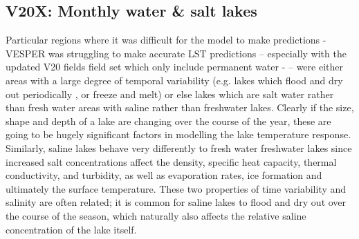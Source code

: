 \documentclass[hess, twostagejnl]{copernicus}
\providecommand{\DIFadd}[1]{{\protect\color{blue} \sf #1}} %
\providecommand{\DIFdel}[1]{{\protect\color{red} \scriptsize #1}} %
\providecommand{\DIFaddbegin}{} %
\providecommand{\DIFaddend}{} %
\providecommand{\DIFdelbegin}{} %
\providecommand{\DIFdelend}{} %
\begin{document}
\DIFaddend 

\DIFdelbegin \subsection{\DIFdel{V20X: Monthly water \& salt lakes}}
\addtocounter{subsection}{-1}%
\DIFdelend Particular regions where \DIFdelbegin \DIFdel{it was difficult for the model to make predictions - }\DIFdelend \DIFaddbegin \DIFadd{VESPER was struggling to make accurate LST predictions – }\DIFaddend especially with the updated V20 \DIFdelbegin \DIFdel{fields }\DIFdelend \DIFaddbegin \DIFadd{field set }\DIFaddend which only include permanent water \DIFdelbegin \DIFdel{- }\DIFdelend \DIFaddbegin \DIFadd{– }\DIFaddend were either areas with a large degree of temporal variability (e.g. lakes which flood and dry out periodically\DIFdelbegin \DIFdel{, or freeze and melt}\DIFdelend ) or else \DIFdelbegin \DIFdel{lakes which are salt water rather than fresh water }\DIFdelend \DIFaddbegin \DIFadd{areas with saline rather than freshwater }\DIFaddend lakes. Clearly if the size, shape and depth of a lake are changing over the course of the year, these are going to be hugely significant factors in modelling the lake temperature response. Similarly, saline lakes behave very differently to \DIFdelbegin \DIFdel{fresh water }\DIFdelend \DIFaddbegin \DIFadd{freshwater }\DIFaddend lakes since increased salt concentrations affect the density, specific heat capacity, thermal conductivity, and turbidity, as well as evaporation rates, ice formation and ultimately the surface temperature. These two properties of time variability and salinity are often related; it is common for saline lakes to flood and dry out over the course of the season, which naturally also affects the relative saline concentration of the lake itself. \newline 
\end{document}
